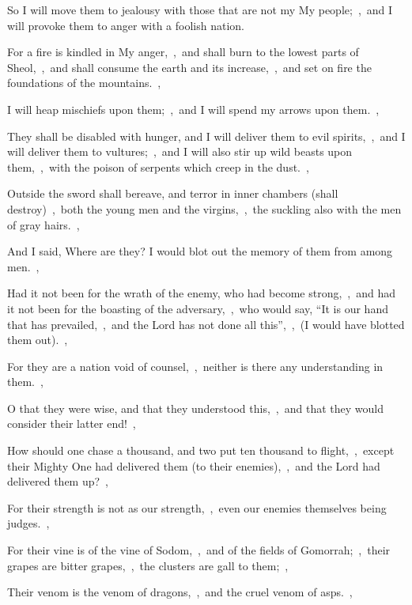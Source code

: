 \documentclass[12pt,twoside,a5paper]{article}
\begin{document}
\begin{normalparskip}
  So I will move them to jealousy with those that are not my My people;~\sep\ and I will provoke them to anger with a foolish nation.


  For a fire is kindled in My anger,~\sep\ and shall burn to the lowest parts of Sheol,~\sep\ and shall consume the earth and its increase,~\sep\ and set on fire the foundations of the mountains.~\sep

  I will heap mischiefs upon them;~\sep\ and I will spend my arrows upon them.~\sep

  They shall be disabled with hunger, and I will deliver them to evil spirits,~\sep\ and I will deliver them to vultures;~\sep\ and I will also stir up wild beasts upon them,~\sep\ with the poison of serpents which creep in the dust.~\sep

  Outside the sword shall bereave, and terror in inner chambers (shall destroy)~\sep\ both the young men and the virgins,~\sep\ the suckling also with the men of gray hairs.~\sep

  And I said, Where are they? I would blot out the memory of them from among men.~\sep

  Had it not been for the wrath of the enemy, who had become strong,~\sep\ and had it not been for the boasting of the adversary,~\sep\ who would say, ``It is our hand that has prevailed,~\sep\ and the Lord has not done all this'',~\sep\ (I would have blotted them out).~\sep

  For they are a nation void of counsel,~\sep\ neither is there any understanding in them.~\sep

  O that they were wise, and that they understood this,~\sep\ and that they would consider their latter end!~\sep

  How should one chase a thousand, and two put ten thousand to flight,~\sep\ except their Mighty One had delivered them (to their enemies),~\sep\ and the Lord had delivered them up?~\sep

  For their strength is not as our strength,~\sep\ even our enemies themselves being judges.~\sep

  For their vine is of the vine of Sodom,~\sep\ and of the fields of Gomorrah;~\sep\ their grapes are bitter grapes,~\sep\ the clusters are gall to them;~\sep

  Their venom is the venom of dragons,~\sep\ and the cruel venom of asps.~\sep


\end{normalparskip}
\end{document}
